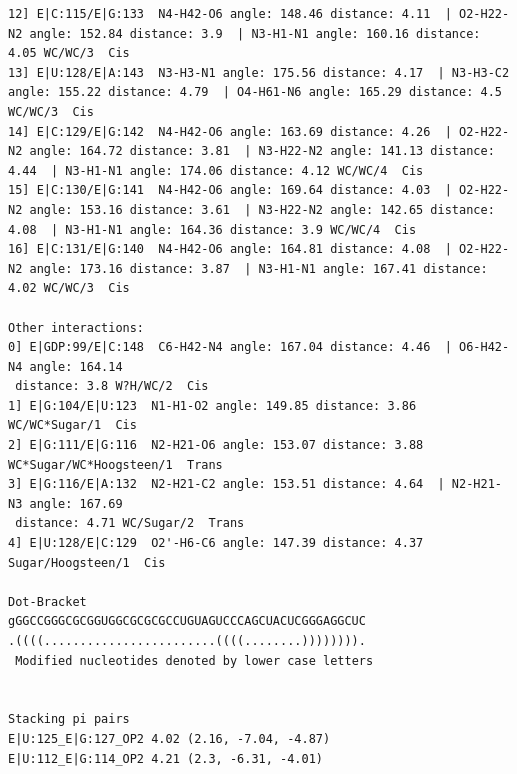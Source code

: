 \documentclass[12pt]{article}
\begin{document}
\begin{appendices}
\begin{scriptsize}
\begin{lstlisting}
12] E|C:115/E|G:133  N4-H42-O6 angle: 148.46 distance: 4.11  | O2-H22-N2 angle: 152.84 distance: 3.9  | N3-H1-N1 angle: 160.16 distance: 4.05 WC/WC/3  Cis
13] E|U:128/E|A:143  N3-H3-N1 angle: 175.56 distance: 4.17  | N3-H3-C2 angle: 155.22 distance: 4.79  | O4-H61-N6 angle: 165.29 distance: 4.5 WC/WC/3  Cis
14] E|C:129/E|G:142  N4-H42-O6 angle: 163.69 distance: 4.26  | O2-H22-N2 angle: 164.72 distance: 3.81  | N3-H22-N2 angle: 141.13 distance: 4.44  | N3-H1-N1 angle: 174.06 distance: 4.12 WC/WC/4  Cis
15] E|C:130/E|G:141  N4-H42-O6 angle: 169.64 distance: 4.03  | O2-H22-N2 angle: 153.16 distance: 3.61  | N3-H22-N2 angle: 142.65 distance: 4.08  | N3-H1-N1 angle: 164.36 distance: 3.9 WC/WC/4  Cis
16] E|C:131/E|G:140  N4-H42-O6 angle: 164.81 distance: 4.08  | O2-H22-N2 angle: 173.16 distance: 3.87  | N3-H1-N1 angle: 167.41 distance: 4.02 WC/WC/3  Cis

Other interactions: 
0] E|GDP:99/E|C:148  C6-H42-N4 angle: 167.04 distance: 4.46  | O6-H42-N4 angle: 164.14
 distance: 3.8 W?H/WC/2  Cis
1] E|G:104/E|U:123  N1-H1-O2 angle: 149.85 distance: 3.86 WC/WC*Sugar/1  Cis
2] E|G:111/E|G:116  N2-H21-O6 angle: 153.07 distance: 3.88 WC*Sugar/WC*Hoogsteen/1  Trans
3] E|G:116/E|A:132  N2-H21-C2 angle: 153.51 distance: 4.64  | N2-H21-N3 angle: 167.69
 distance: 4.71 WC/Sugar/2  Trans
4] E|U:128/E|C:129  O2'-H6-C6 angle: 147.39 distance: 4.37 Sugar/Hoogsteen/1  Cis

Dot-Bracket
gGGCCGGGCGCGGUGGCGCGCGCCUGUAGUCCCAGCUACUCGGGAGGCUC
.((((........................((((........)))))))).
 Modified nucleotides denoted by lower case letters


Stacking pi pairs
E|U:125_E|G:127_OP2 4.02 (2.16, -7.04, -4.87)
E|U:112_E|G:114_OP2 4.21 (2.3, -6.31, -4.01)

\end{lstlisting}
\end{scriptsize}

\end{appendices}


\end{document}
